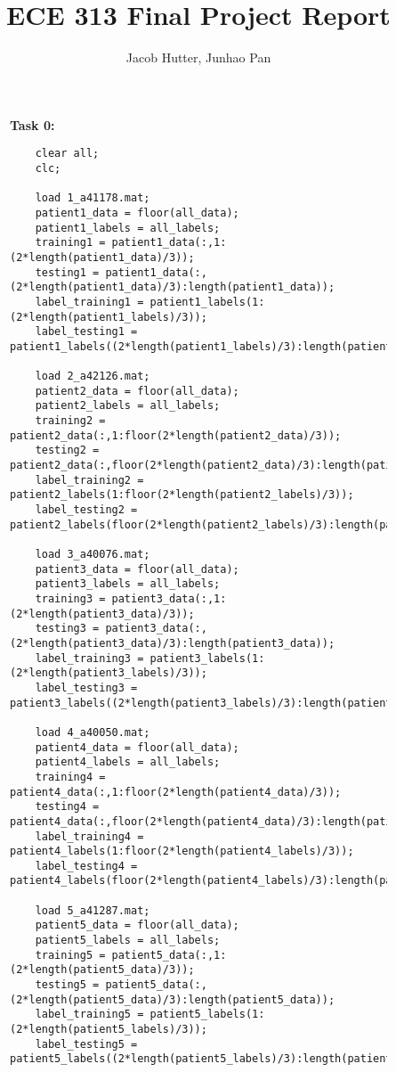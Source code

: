 \documentclass{article}
\author{Jacob Hutter, Junhao Pan}
\title{ECE 313 Final Project Report}
\begin{document}
\maketitle

\begin{figure}[H]
\textbf{Task 0:}
\begin{lstlisting}
    clear all;
    clc;

    load 1_a41178.mat;
    patient1_data = floor(all_data);
    patient1_labels = all_labels;
    training1 = patient1_data(:,1:(2*length(patient1_data)/3));
    testing1 = patient1_data(:,(2*length(patient1_data)/3):length(patient1_data));
    label_training1 = patient1_labels(1:(2*length(patient1_labels)/3));
    label_testing1 = patient1_labels((2*length(patient1_labels)/3):length(patient1_labels));

    load 2_a42126.mat;
    patient2_data = floor(all_data);
    patient2_labels = all_labels;
    training2 = patient2_data(:,1:floor(2*length(patient2_data)/3));
    testing2 = patient2_data(:,floor(2*length(patient2_data)/3):length(patient2_data));
    label_training2 = patient2_labels(1:floor(2*length(patient2_labels)/3));
    label_testing2 = patient2_labels(floor(2*length(patient2_labels)/3):length(patient2_labels));

    load 3_a40076.mat;
    patient3_data = floor(all_data);
    patient3_labels = all_labels;
    training3 = patient3_data(:,1:(2*length(patient3_data)/3));
    testing3 = patient3_data(:,(2*length(patient3_data)/3):length(patient3_data));
    label_training3 = patient3_labels(1:(2*length(patient3_labels)/3));
    label_testing3 = patient3_labels((2*length(patient3_labels)/3):length(patient3_labels));

    load 4_a40050.mat;
    patient4_data = floor(all_data);
    patient4_labels = all_labels;
    training4 = patient4_data(:,1:floor(2*length(patient4_data)/3));
    testing4 = patient4_data(:,floor(2*length(patient4_data)/3):length(patient4_data));
    label_training4 = patient4_labels(1:floor(2*length(patient4_labels)/3));
    label_testing4 = patient4_labels(floor(2*length(patient4_labels)/3):length(patient4_labels));

    load 5_a41287.mat;
    patient5_data = floor(all_data);
    patient5_labels = all_labels;
    training5 = patient5_data(:,1:(2*length(patient5_data)/3));
    testing5 = patient5_data(:,(2*length(patient5_data)/3):length(patient5_data));
    label_training5 = patient5_labels(1:(2*length(patient5_labels)/3));
    label_testing5 = patient5_labels((2*length(patient5_labels)/3):length(patient5_labels));


\end{lstlisting}
\end{figure}
\end{document}
